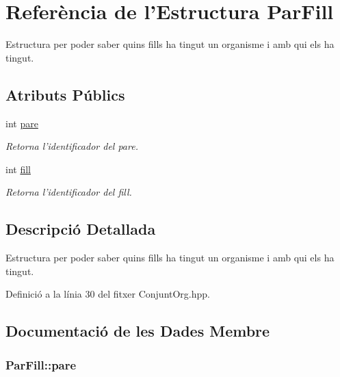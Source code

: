 \hypertarget{struct_par_fill}{\section{Referència de l'Estructura Par\-Fill}
\label{struct_par_fill}
}


Estructura per poder saber quins fills ha tingut un organisme i amb qui els ha tingut.  


\subsection*{Atributs Públics}
\begin{DoxyCompactItemize}
\item 
int \hyperlink{struct_par_fill_a6bf4c0e229d9894e9f1988d017e20f2c}{pare}
\begin{DoxyCompactList}\small\item\em Retorna l'identificador del pare. \end{DoxyCompactList}\item 
int \hyperlink{struct_par_fill_af35c09c217a6bc97860535cc395ebc94}{fill}
\begin{DoxyCompactList}\small\item\em Retorna l'identificador del fill. \end{DoxyCompactList}\end{DoxyCompactItemize}


\subsection{Descripció Detallada}
Estructura per poder saber quins fills ha tingut un organisme i amb qui els ha tingut. 

Definició a la línia 30 del fitxer Conjunt\-Org.\-hpp.



\subsection{Documentació de les Dades Membre}
\hypertarget{struct_par_fill_a6bf4c0e229d9894e9f1988d017e20f2c}{
\subsubsection[{pare}]{\setlength{\rightskip}{0pt plus 5cm}Par\-Fill\-::pare}}\label{struct_par_fill_a6bf4c0e229d9894e9f1988d017e20f2c}


